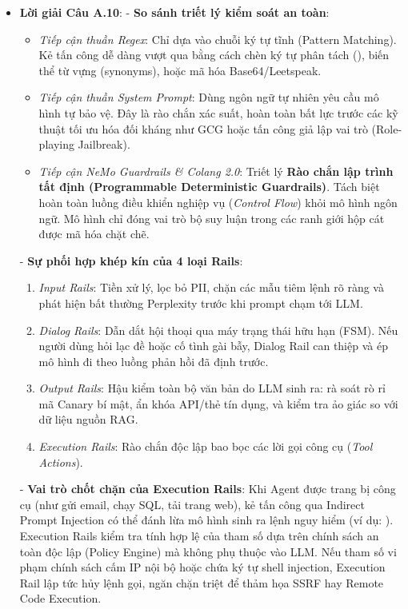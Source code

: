 \begin{itemize}
  \item \textbf{Lời giải Câu A.10}:
  - \textbf{So sánh triết lý kiểm soát an toàn}:
    \begin{itemize}
      \item \textit{Tiếp cận thuần Regex}: Chỉ dựa vào chuỗi ký tự tĩnh (Pattern Matching). Kẻ tấn công dễ dàng vượt qua bằng cách chèn ký tự phân tách (), biến thể từ vựng (synonyms), hoặc mã hóa Base64/Leetspeak.
      \item \textit{Tiếp cận thuần System Prompt}: Dùng ngôn ngữ tự nhiên yêu cầu mô hình tự bảo vệ. Đây là rào chắn xác suất, hoàn toàn bất lực trước các kỹ thuật tối ưu hóa đối kháng như GCG hoặc tấn công giả lập vai trò (Role-playing Jailbreak).
      \item \textit{Tiếp cận NeMo Guardrails \& Colang 2.0}: Triết lý \textbf{Rào chắn lập trình tất định (Programmable Deterministic Guardrails)}. Tách biệt hoàn toàn luồng điều khiển nghiệp vụ (\textit{Control Flow}) khỏi mô hình ngôn ngữ. Mô hình chỉ đóng vai trò bộ suy luận trong các ranh giới hộp cát được mã hóa chặt chẽ.
    \end{itemize}
  - \textbf{Sự phối hợp khép kín của 4 loại Rails}:
    \begin{enumerate}
      \item \textit{Input Rails}: Tiền xử lý, lọc bỏ PII, chặn các mẫu tiêm lệnh rõ ràng và phát hiện bất thường Perplexity trước khi prompt chạm tới LLM.
      \item \textit{Dialog Rails}: Dẫn dắt hội thoại qua máy trạng thái hữu hạn (FSM). Nếu người dùng hỏi lạc đề hoặc cố tình gài bẫy, Dialog Rail can thiệp và ép mô hình đi theo luồng phản hồi đã định trước.
      \item \textit{Output Rails}: Hậu kiểm toàn bộ văn bản do LLM sinh ra: rà soát rò rỉ mã Canary bí mật, ẩn khóa API/thẻ tín dụng, và kiểm tra ảo giác so với dữ liệu nguồn RAG.
      \item \textit{Execution Rails}: Rào chắn độc lập bao bọc các lời gọi công cụ (\textit{Tool Actions}).
    \end{enumerate}
  - \textbf{Vai trò chốt chặn của Execution Rails}: Khi Agent được trang bị công cụ (như gửi email, chạy SQL, tải trang web), kẻ tấn công qua Indirect Prompt Injection có thể đánh lừa mô hình sinh ra lệnh nguy hiểm (ví dụ: ). Execution Rails kiểm tra tính hợp lệ của tham số dựa trên chính sách an toàn độc lập (Policy Engine) mà không phụ thuộc vào LLM. Nếu tham số vi phạm chính sách cấm IP nội bộ hoặc chứa ký tự shell injection, Execution Rail lập tức hủy lệnh gọi, ngăn chặn triệt để thảm họa SSRF hay Remote Code Execution.
\end{itemize}

